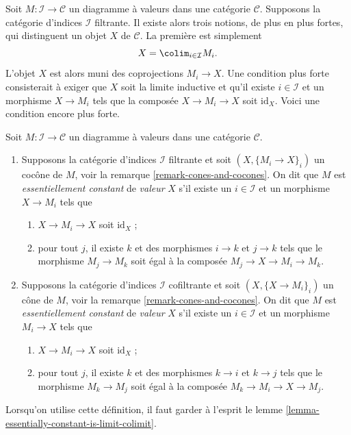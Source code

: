 \noindent
Soit $M : \mathcal{I} \to \mathcal{C}$ un diagramme à valeurs dans une catégorie
$\mathcal{C}$. Supposons la catégorie d'indices $\mathcal{I}$ filtrante.
Il existe alors trois notions, de plus en plus fortes, qui distinguent un
objet $X$ de $\mathcal{C}$. La première est simplement
$$
X = \colim_{i \in \mathcal{I}} M_i.
$$
L'objet $X$ est alors muni des coprojections $M_i \to X$. Une condition plus
forte consisterait à exiger que $X$ soit la limite inductive et qu'il existe
$i \in \mathcal{I}$ et un morphisme $X \to M_i$ tels que la composée
$X \to M_i \to X$ soit $\text{id}_X$. Voici une condition encore plus forte.

\begin{definition}
\label{definition-essentially-constant-diagram}
Soit $M : \mathcal{I} \to \mathcal{C}$ un diagramme à valeurs dans une catégorie
$\mathcal{C}$.
\begin{enumerate}
\item Supposons la catégorie d'indices $\mathcal{I}$ filtrante et soit
$(X, \{M_i \to X\}_i)$ un cocône de $M$, voir la
remarque \ref{remark-cones-and-cocones}. On dit que $M$ est
{\it essentiellement constant} de {\it valeur} $X$ s'il existe un
$i \in \mathcal{I}$ et un morphisme $X \to M_i$ tels que
\begin{enumerate}
\item $X \to M_i \to X$ soit $\text{id}_X$ ;
\item pour tout $j$, il existe $k$ et des morphismes $i \to k$ et
$j \to k$ tels que le morphisme $M_j \to M_k$ soit égal à la composée
$M_j \to X \to M_i \to M_k$.
\end{enumerate}
\item Supposons la catégorie d'indices $\mathcal{I}$ cofiltrante et soit
$(X, \{X \to M_i\}_i)$ un cône de $M$, voir la
remarque \ref{remark-cones-and-cocones}. On dit que $M$ est
{\it essentiellement constant} de {\it valeur} $X$ s'il existe un
$i \in \mathcal{I}$ et un morphisme $M_i \to X$ tels que
\begin{enumerate}
\item $X \to M_i \to X$ soit $\text{id}_X$ ;
\item pour tout $j$, il existe $k$ et des morphismes $k \to i$ et
$k \to j$ tels que le morphisme $M_k \to M_j$ soit égal à la composée
$M_k \to M_i \to X \to M_j$.
\end{enumerate}
\end{enumerate}
Lorsqu'on utilise cette définition, il faut garder à l'esprit le
lemme \ref{lemma-essentially-constant-is-limit-colimit}.
\end{definition}

